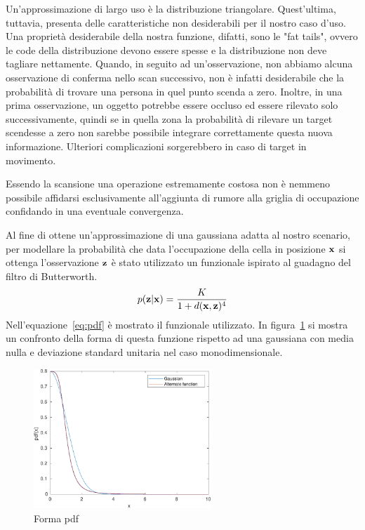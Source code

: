 \documentclass[a4paper]{article}
\begin{document}
	Un'approssimazione di largo uso è la distribuzione triangolare.
	Quest'ultima, tuttavia, presenta delle caratteristiche non desiderabili per
	il nostro caso d'uso. Una proprietà desiderabile della nostra funzione,
	difatti, sono le "fat tails", ovvero le code della distribuzione devono
	essere spesse e la distribuzione non deve tagliare nettamente. Quando, in
	seguito ad un'osservazione, non abbiamo alcuna osservazione di conferma
	nello scan successivo, non è infatti desiderabile che la probabilità di
	trovare una persona in quel punto scenda a zero. Inoltre, in una prima
	osservazione, un oggetto potrebbe essere occluso ed essere rilevato solo
	successivamente, quindi se in quella zona la probabilità di rilevare un
	target scendesse a zero non sarebbe possibile integrare correttamente
	questa nuova informazione. Ulteriori complicazioni sorgerebbero in caso di
	target in movimento.
	
	Essendo la scansione una operazione estremamente costosa non è nemmeno
	possibile affidarsi esclusivamente all'aggiunta di rumore alla griglia di
	occupazione confidando in una eventuale convergenza.

	Al fine di ottene un'approssimazione di una gaussiana adatta al
	nostro scenario, per modellare la probabilità che data l'occupazione della
	cella in posizione $ {\bf x} $ si ottenga l'osservazione $ {\bf z} $ è
	stato utilizzato un funzionale ispirato al guadagno del filtro di
	Butterworth.
	\begin{equation}\label{eq:pdf}
		p({\bf z}|{\bf x}) = \frac	{K}
		{1 + d({\bf x},{\bf z})^4 } 
	\end{equation}
	Nell'equazione~\ref{eq:pdf} è mostrato il funzionale utilizzato. In
	figura~\ref{fig:pdf_shape} si mostra un confronto della forma di questa
	funzione rispetto ad una gaussiana con media nulla e deviazione standard
	unitaria nel caso monodimensionale.
	
	\begin{figure}[H]
		\centering
		\includegraphics[width=0.6\textwidth]{./img/pdf_shape.pdf}
		\caption{Forma pdf}
		\label{fig:pdf_shape}
	\end{figure}
\end{document}
